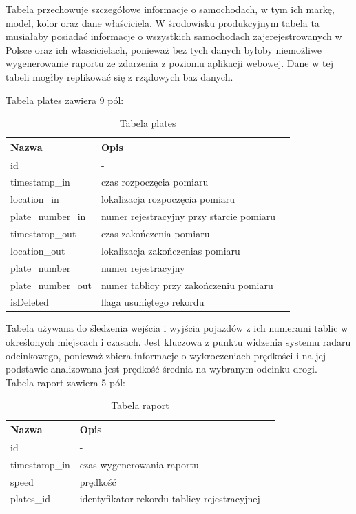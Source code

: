 \documentclass[12pt,a4paper,oneside]{article}
\theoremstyle{definition}
\numberwithin{equation}{section}
\begin{document}
        Tabela przechowuje szczegółowe informacje o samochodach, w tym ich markę, model, kolor oraz dane właściciela. W środowisku produkcyjnym tabela ta musiałaby posiadać informacje o wszystkich samochodach zajerejestrowanych w Polsce oraz ich włascicielach, ponieważ bez tych danych byłoby niemożliwe wygenerowanie raportu ze zdarzenia z poziomu aplikacji webowej. Dane w tej tabeli mogłby replikować się z rządowych baz danych.  

    \newpage
    Tabela plates zawiera 9 pól:

    \begin{table}[h]
    \centering
    \begin{tabularx}{\textwidth}{|X|X|X|}
    \hline
    \textbf{Nazwa} & \textbf{Opis} \\ \hline
    id &  -   \\ \hline
    timestamp{\_}in & czas rozpoczęcia pomiaru \\  \hline
    location{\_}in & lokalizacja rozpoczęcia pomiaru \\  \hline
    plate{\_}number{\_}in & numer rejestracyjny przy starcie pomiaru \\  \hline
    timestamp{\_}out & czas zakończenia pomiaru \\  \hline
    location{\_}out & lokalizacja zakończenias pomiaru \\ \hline
    plate{\_}number & numer rejestracyjny \\ \hline
    plate{\_}number{\_}out & numer tablicy przy zakończeniu pomiaru \\ \hline
    isDeleted & flaga usuniętego rekordu \\ \hline
    \end{tabularx}
    \caption{Tabela plates}
    \end{table}
        
        Tabela używana do śledzenia wejścia i wyjścia pojazdów z ich numerami tablic w określonych miejscach i czasach. Jest kluczowa z punktu widzenia systemu radaru odcinkowego, ponieważ zbiera informacje o wykroczeniach prędkości i na jej podstawie analizowana jest prędkość średnia na wybranym odcinku drogi.\\


    Tabela raport zawiera 5 pól: 

    \begin{table}[h]
    \centering
    \begin{tabularx}{\textwidth}{|X|X|X|}
    \hline
    \textbf{Nazwa} & \textbf{Opis} \\ \hline
    id &  -   \\ \hline
    timestamp{\_}in & czas wygenerowania raportu \\  \hline
    speed & prędkość \\  \hline
    plates{\_}id & identyfikator rekordu tablicy rejestracyjnej \\  \hline
    \end{tabularx}
    \caption{Tabela raport}
    \end{table}
            
\end{document}
